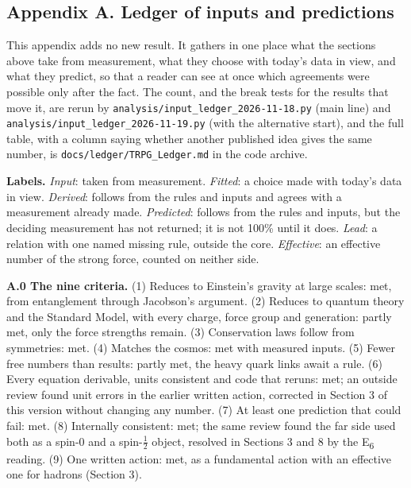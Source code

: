\documentclass[
  11pt,
]{article}
\begin{document}
\hypertarget{appendix-a-ledger-of-inputs-and-predictions}{%
\subsection{Appendix A. Ledger of inputs and predictions}\label{appendix-a-ledger-of-inputs-and-predictions}}

This appendix adds no new result. It gathers in one place what the sections above take from measurement, what they choose with today's data in view, and what they predict, so that a reader can see at once which agreements were possible only after the fact. The count, and the break tests for the results that move it, are rerun by \texttt{analysis/input\_ledger\_2026-11-18.py} (main line) and \texttt{analysis/input\_ledger\_2026-11-19.py} (with the alternative start), and the full table, with a column saying whether another published idea gives the same number, is \texttt{docs/ledger/TRPG\_Ledger.md} in the code archive.

\textbf{Labels.} \emph{Input}: taken from measurement. \emph{Fitted}: a choice made with today's data in view. \emph{Derived}: follows from the rules and inputs and agrees with a measurement already made. \emph{Predicted}: follows from the rules and inputs, but the deciding measurement has not returned; it is not 100\% until it does. \emph{Lead}: a relation with one named missing rule, outside the core. \emph{Effective}: an effective number of the strong force, counted on neither side.

\textbf{A.0 The nine criteria.} (1) Reduces to Einstein's gravity at large scales: met, from entanglement through Jacobson's argument. (2) Reduces to quantum theory and the Standard Model, with every charge, force group and generation: partly met, only the force strengths remain. (3) Conservation laws follow from symmetries: met. (4) Matches the cosmos: met with measured inputs. (5) Fewer free numbers than results: partly met, the heavy quark links await a rule. (6) Every equation derivable, units consistent and code that reruns: met; an outside review found unit errors in the earlier written action, corrected in Section 3 of this version without changing any number. (7) At least one prediction that could fail: met. (8) Internally consistent: met; the same review found the far side used both as a spin-0 and a spin-\ensuremath{\frac{1}{2}} object, resolved in Sections 3 and 8 by the E\textsubscript{6} reading. (9) One written action: met, as a fundamental action with an effective one for hadrons (Section 3).
\end{document}
